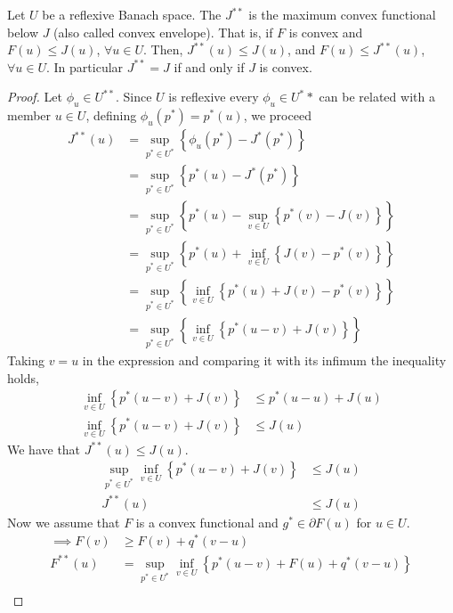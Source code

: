 \begin{theorem}
	Let $U$ be a reflexive Banach space. The $J^{**}$ is the maximum convex functional below $J$ (also called convex envelope). That is, if $F$ is convex and $F(u)\leq J(u)$, $\forall u \in U$. Then, $J^{**}(u)\leq J(u)$, and $F(u)\leq J^{**}(u)$, $\forall u \in U$. In particular $J^{**}=J$ if and only if $J$ is convex.
	\begin{proof}
		Let $\phi_u \in U^{**}$. Since $U$ is reflexive every $\phi_u \in U^**$ can be related with a member $u \in U$, defining $\phi_u(p^*)=p^*(u)$, we proceed 
		\begin{align*}
			J^{**}(u)&=\sup_{p^*\in U^*} \left\lbrace \phi_u(p^*)-J^*(p^*) \right\rbrace\\
					&=\sup_{p^*\in U^*} \left\lbrace p^*(u)-J^*(p^*) \right\rbrace\\
					&=\sup_{p^*\in U^*} \left\lbrace p^*(u)-\sup_{v\in U}\left\lbrace p^*(v)-J(v)\right\rbrace\right\rbrace\\
					&=\sup_{p^*\in U^*} \left\lbrace p^*(u)+\inf_{v\in U}\left\lbrace J(v)-p^*(v)\right\rbrace\right\rbrace\\
					&=\sup_{p^*\in U^*} \left\lbrace \inf_{v\in U}\left\lbrace p^*(u)+ J(v)-p^*(v)\right\rbrace\right\rbrace\\
					&=\sup_{p^*\in U^*} \left\lbrace \inf_{v\in U}\left\lbrace p^*(u-v)+J(v)\right\rbrace\right\rbrace
		\end{align*}
		Taking $v=u$ in the expression and comparing it with its infimum the inequality holds,
			\begin{align*}
				\inf_{v\in U}\left\lbrace p^* \left(u-v\right)+J(v) \right\rbrace &\leq p^*(u-u)+J(u) \\
				\inf_{v\in U}\left\lbrace p^* \left(u-v\right)+J(v) \right\rbrace &\leq J(u)
			\end{align*}
		We have that $J^{**}(u)\leq J(u)$.
		\begin{align*}
		\sup_{p^* \in U^*}\inf_{v\in U}\left\lbrace p^* \left(u-v\right)+J(v) \right\rbrace &\leq J(u)\\
		J^{**}(u) &\leq J(u)
		\end{align*}
		Now we assume that $F$ is a convex functional and $g^* \in \partial F(u)$ for $u \in U$.
		\begin{align*}
			\implies  F(v)&\geq F(v)+q^*(v-u)\\
					  F^{**}(u)& = \sup_{p^* \in U^*} \inf_{v \in U} \left\lbrace p^*(u-v)+F(u)+q^*(v-u)\right\rbrace \\

\end{align*}
\end{proof}
\end{theorem}
